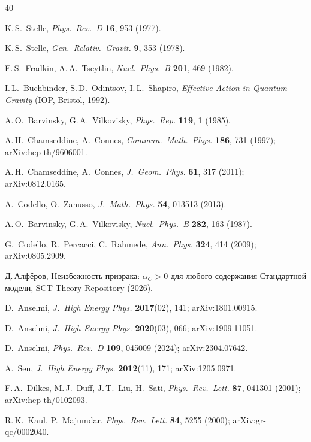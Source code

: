 \documentclass[12pt,a4paper]{article}
\theoremstyle{plain}
\theoremstyle{definition}
\begin{document}
\begin{thebibliography}{40}

K.\,S.~Stelle,
\textit{Phys.\ Rev.\ D} \textbf{16}, 953 (1977).

K.\,S.~Stelle,
\textit{Gen.\ Relativ.\ Gravit.} \textbf{9}, 353 (1978).

E.\,S.~Fradkin, A.\,A.~Tseytlin,
\textit{Nucl.\ Phys.\ B} \textbf{201}, 469 (1982).

I.\,L.~Buchbinder, S.\,D.~Odintsov, I.\,L.~Shapiro,
\textit{Effective Action in Quantum Gravity}
(IOP, Bristol, 1992).

A.\,O.~Barvinsky, G.\,A.~Vilkovisky,
\textit{Phys.\ Rep.} \textbf{119}, 1 (1985).

A.\,H.~Chamseddine, A.~Connes,
\textit{Commun.\ Math.\ Phys.} \textbf{186}, 731 (1997);
arXiv:hep-th/9606001.

A.\,H.~Chamseddine, A.~Connes,
\textit{J.\ Geom.\ Phys.} \textbf{61}, 317 (2011);
arXiv:0812.0165.

A.~Codello, O.~Zanusso,
\textit{J.\ Math.\ Phys.} \textbf{54}, 013513 (2013).

A.\,O.~Barvinsky, G.\,A.~Vilkovisky,
\textit{Nucl.\ Phys.\ B} \textbf{282}, 163 (1987).

G.~Codello, R.~Percacci, C.~Rahmede,
\textit{Ann.\ Phys.} \textbf{324}, 414 (2009);
arXiv:0805.2909.

Д.\,Алфёров,
Неизбежность призрака: $\alpha_C > 0$ для любого содержания
Стандартной модели,
SCT Theory Repository (2026).

D.~Anselmi,
\textit{J.\ High Energy Phys.} \textbf{2017}(02), 141;
arXiv:1801.00915.

D.~Anselmi,
\textit{J.\ High Energy Phys.} \textbf{2020}(03), 066;
arXiv:1909.11051.

D.~Anselmi,
\textit{Phys.\ Rev.\ D} \textbf{109}, 045009 (2024);
arXiv:2304.07642.

A.~Sen,
\textit{J.\ High Energy Phys.} \textbf{2012}(11), 171;
arXiv:1205.0971.

F.\,A.~Dilkes, M.\,J.~Duff, J.\,T.~Liu, H.~Sati,
\textit{Phys.\ Rev.\ Lett.} \textbf{87}, 041301 (2001);
arXiv:hep-th/0102093.

R.\,K.~Kaul, P.~Majumdar,
\textit{Phys.\ Rev.\ Lett.} \textbf{84}, 5255 (2000);
arXiv:gr-qc/0002040.


\end{thebibliography}
\end{document}
